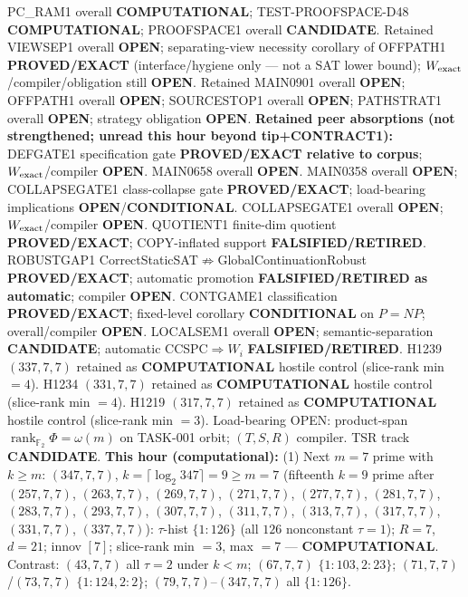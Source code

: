 \documentclass[11pt]{article}
\begin{document}
PC\_RAM1 overall \textbf{COMPUTATIONAL}; TEST-PROOFSPACE-D48 \textbf{COMPUTATIONAL};
PROOFSPACE1 overall \textbf{CANDIDATE}.
Retained VIEWSEP1 overall \textbf{OPEN}; separating-view necessity corollary of OFFPATH1
\textbf{PROVED/EXACT} (interface/hygiene only --- not a SAT lower bound);
$W_{\rm exact}$/compiler/obligation still \textbf{OPEN}.
Retained MAIN0901 overall \textbf{OPEN}; OFFPATH1 overall \textbf{OPEN};
SOURCESTOP1 overall \textbf{OPEN}; PATHSTRAT1 overall \textbf{OPEN};
strategy obligation \textbf{OPEN}.
\textbf{Retained peer absorptions (not strengthened; unread this hour beyond tip+CONTRACT1):}
DEFGATE1 specification gate \textbf{PROVED/EXACT relative to corpus};
$W_{\rm exact}$/compiler \textbf{OPEN}.
MAIN0658 overall \textbf{OPEN}.
MAIN0358 overall \textbf{OPEN}; COLLAPSEGATE1 class-collapse gate \textbf{PROVED/EXACT};
load-bearing implications \textbf{OPEN}/\textbf{CONDITIONAL}.
COLLAPSEGATE1 overall \textbf{OPEN}; $W_{\rm exact}$/compiler \textbf{OPEN}.
QUOTIENT1 finite-dim quotient \textbf{PROVED/EXACT}; COPY-inflated support \textbf{FALSIFIED/RETIRED}.
ROBUSTGAP1 CorrectStaticSAT$\not\Rightarrow$GlobalContinuationRobust \textbf{PROVED/EXACT};
automatic promotion \textbf{FALSIFIED/RETIRED as automatic}; compiler \textbf{OPEN}.
CONTGAME1 classification \textbf{PROVED/EXACT}; fixed-level corollary \textbf{CONDITIONAL} on $P=NP$;
overall/compiler \textbf{OPEN}.
LOCALSEM1 overall \textbf{OPEN}; semantic-separation \textbf{CANDIDATE}; automatic CCSPC$\Rightarrow W_i$
\textbf{FALSIFIED/RETIRED}.
H1239 $(337,7,7)$ retained as \textbf{COMPUTATIONAL} hostile control (slice-rank min $=4$).
H1234 $(331,7,7)$ retained as \textbf{COMPUTATIONAL} hostile control (slice-rank min $=4$).
H1219 $(317,7,7)$ retained as \textbf{COMPUTATIONAL} hostile control (slice-rank min $=3$).
Load-bearing OPEN: product-span $\operatorname{rank}_{\mathbb F_2}\Phi=\omega(m)$ on TASK-001 orbit;
$(T,S,R)$ compiler. TSR track \textbf{CANDIDATE}.
\textbf{This hour (computational):}
(1) Next $m{=}7$ prime with $k{\ge}m$: $(347,7,7)$, $k{=}\lceil\log_2 347\rceil=9{\ge}m{=}7$
(fifteenth $k{=}9$ prime after $(257,7,7)$, $(263,7,7)$, $(269,7,7)$, $(271,7,7)$, $(277,7,7)$, $(281,7,7)$, $(283,7,7)$, $(293,7,7)$, $(307,7,7)$, $(311,7,7)$, $(313,7,7)$, $(317,7,7)$, $(331,7,7)$, $(337,7,7)$):
$\tau$-hist $\{1{:}126\}$ (all $126$ nonconstant $\tau{=}1$); $R{=}7$, $d{=}21$; innov $[7]$;
slice-rank min $=3$, max $=7$ --- \textbf{COMPUTATIONAL}.
Contrast: $(43,7,7)$ all $\tau{=}2$ under $k{\lt}m$; $(67,7,7)$ $\{1{:}103,2{:}23\}$;
$(71,7,7)$/$(73,7,7)$ $\{1{:}124,2{:}2\}$; $(79,7,7)$--$(347,7,7)$ all $\{1{:}126\}$.
\end{document}
